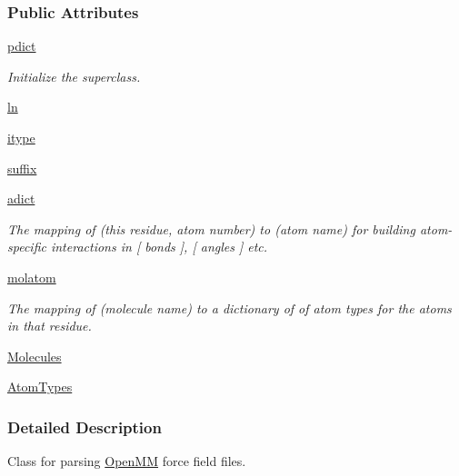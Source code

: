 \subsubsection*{Public Attributes}
\begin{DoxyCompactItemize}
\item 
\hyperlink{classforcebalance_1_1openmmio_1_1OpenMM__Reader_a4fa2da992c7f0f525dcc465ffba69b86}{pdict}
\begin{DoxyCompactList}\small\item\em Initialize the superclass. \end{DoxyCompactList}\item 
\hyperlink{classforcebalance_1_1BaseReader_a80c8e3bea212600742968aa8669e557b}{ln}
\item 
\hyperlink{classforcebalance_1_1BaseReader_a22ff3f4c684c728e019d801fface36f6}{itype}
\item 
\hyperlink{classforcebalance_1_1BaseReader_a48ef0584a1b6b4b6f8eb741ad8465db8}{suffix}
\item 
\hyperlink{classforcebalance_1_1BaseReader_a2c46ad6b66cf09a30e917ce4a1997e2a}{adict}
\begin{DoxyCompactList}\small\item\em The mapping of (this residue, atom number) to (atom name) for building atom-\/specific interactions in \mbox{[} bonds \mbox{]}, \mbox{[} angles \mbox{]} etc. \end{DoxyCompactList}\item 
\hyperlink{classforcebalance_1_1BaseReader_ab444c213e15929253dd73395ac5f19fc}{molatom}
\begin{DoxyCompactList}\small\item\em The mapping of (molecule name) to a dictionary of of atom types for the atoms in that residue. \end{DoxyCompactList}\item 
\hyperlink{classforcebalance_1_1BaseReader_a4369b5fb663a83b11602daa71db6862e}{Molecules}
\item 
\hyperlink{classforcebalance_1_1BaseReader_a69ca7d949a4a3df4d9f61e617fe0e270}{Atom\-Types}
\end{DoxyCompactItemize}


\subsubsection{Detailed Description}
Class for parsing \hyperlink{classforcebalance_1_1openmmio_1_1OpenMM}{Open\-M\-M} force field files. 



